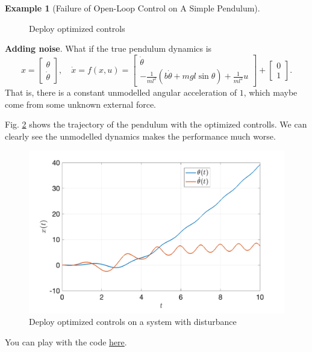 \documentclass[
]{book}
\theoremstyle{definition}
\theoremstyle{definition}
\newtheorem{example}{Example}[chapter]
\theoremstyle{definition}
\theoremstyle{definition}
\theoremstyle{remark}
\begin{document}
\begin{example}[Failure of Open-Loop Control on A Simple Pendulum]
\begin{figure}
{}

\caption{Deploy optimized controls}\label{fig:pendulum-swingup-trajopt-collocation-deploy}
\end{figure}

\textbf{Adding noise}. What if the true pendulum dynamics is
\[
x = \begin{bmatrix} \theta \\ \dot{\theta} \end{bmatrix}, \quad \dot{x} = f(x,u) = \begin{bmatrix} \dot{\theta} \\ - \frac{1}{ml^2} (b \dot{\theta} + mgl \sin \theta) + \frac{1}{ml^2} u \end{bmatrix} + \begin{bmatrix} 0 \\ 1 \end{bmatrix}.
\]
That is, there is a constant unmodelled angular acceleration of \(1\), which maybe come from some unknown external force.

Fig. \ref{fig:pendulum-swingup-trajopt-collocation-deploy-noise} shows the trajectory of the pendulum with the optimized controlls. We can clearly see the unmodelled dynamics makes the performance much worse.

\begin{figure}

{\centering \includegraphics[width=0.8\linewidth]{images/pendulum_trajopt_deploy_noise} 

}

\caption{Deploy optimized controls on a system with disturbance}\label{fig:pendulum-swingup-trajopt-collocation-deploy-noise}
\end{figure}

You can play with the code \href{https://github.com/ComputationalRobotics/OptimalControlEstimation-Examples/blob/main/pendulum_mpc/pendulum_open_loop.m}{here}.
\end{example}
\end{document}
